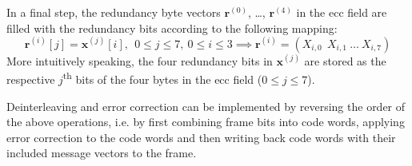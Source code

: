 In a final step, the redundancy byte vectors $\mathbf r^{(0)}$, \ldots, $\mathbf r^{(4)}$ in the \gls{ecc} field are filled with the redundancy bits according to the following mapping:
\begin{equation}
	\mathbf r^{(i)}[j] = \mathbf x^{(j)}[i], ~~ 0 \leq j \leq 7, ~ 0 \leq i \leq 3
	\implies \mathbf r^{(i)} = \left( X_{i, 0} ~~ X_{i, 1} ~ \dots ~ X_{i, 7}  \right)
\end{equation}
More intuitively speaking, the four redundancy bits in $\mathbf x^{(j)}$ are stored as the respective $j$\textsuperscript{th} bits of the four bytes in the \gls{ecc} field ($0 \leq j \leq 7$).

Deinterleaving and error correction can be implemented by reversing the order of the above operations, i.e. by first combining frame bits into code words, applying error correction to the code words and then writing back code words with their included message vectors to the frame.

